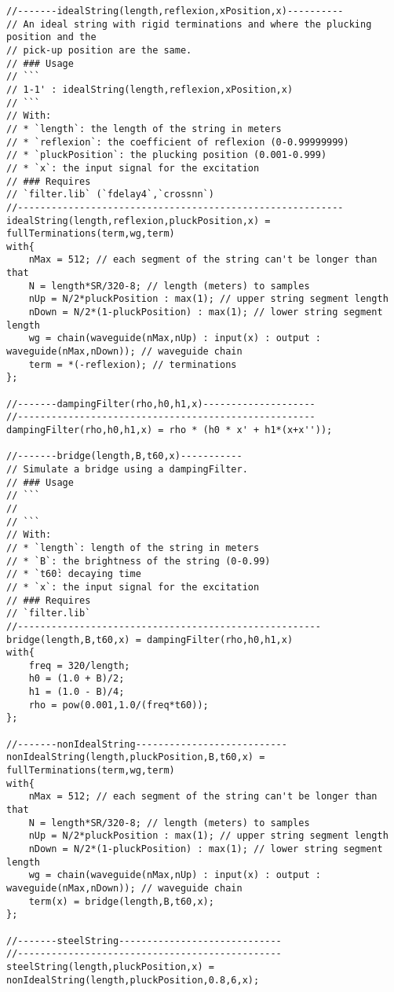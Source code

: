 \begin{lstlisting}
//-------idealString(length,reflexion,xPosition,x)----------
// An ideal string with rigid terminations and where the plucking position and the 
// pick-up position are the same. 
// ### Usage
// ```
// 1-1' : idealString(length,reflexion,xPosition,x)
// ```
// With:
// * `length`: the length of the string in meters
// * `reflexion`: the coefficient of reflexion (0-0.99999999)
// * `pluckPosition`: the plucking position (0.001-0.999)
// * `x`: the input signal for the excitation
// ### Requires
// `filter.lib` (`fdelay4`,`crossnn`)
//----------------------------------------------------------
idealString(length,reflexion,pluckPosition,x) = fullTerminations(term,wg,term)
with{
	nMax = 512; // each segment of the string can't be longer than that
	N = length*SR/320-8; // length (meters) to samples
	nUp = N/2*pluckPosition : max(1); // upper string segment length
	nDown = N/2*(1-pluckPosition) : max(1); // lower string segment length
	wg = chain(waveguide(nMax,nUp) : input(x) : output : waveguide(nMax,nDown)); // waveguide chain
	term = *(-reflexion); // terminations
};

//-------dampingFilter(rho,h0,h1,x)--------------------
//-----------------------------------------------------
dampingFilter(rho,h0,h1,x) = rho * (h0 * x' + h1*(x+x''));

//-------bridge(length,B,t60,x)-----------
// Simulate a bridge using a dampingFilter.
// ### Usage
// ```
//
// ```
// With:
// * `length`: length of the string in meters
// * `B`: the brightness of the string (0-0.99)
// * `t60̀: decaying time
// * `x`: the input signal for the excitation
// ### Requires
// `filter.lib`
//------------------------------------------------------
bridge(length,B,t60,x) = dampingFilter(rho,h0,h1,x)
with{
	freq = 320/length;
	h0 = (1.0 + B)/2;
	h1 = (1.0 - B)/4;
	rho = pow(0.001,1.0/(freq*t60));
};

//-------nonIdealString---------------------------
nonIdealString(length,pluckPosition,B,t60,x) = fullTerminations(term,wg,term)
with{
	nMax = 512; // each segment of the string can't be longer than that
	N = length*SR/320-8; // length (meters) to samples
	nUp = N/2*pluckPosition : max(1); // upper string segment length
	nDown = N/2*(1-pluckPosition) : max(1); // lower string segment length
	wg = chain(waveguide(nMax,nUp) : input(x) : output : waveguide(nMax,nDown)); // waveguide chain
	term(x) = bridge(length,B,t60,x);
};

//-------steelString-----------------------------
//-----------------------------------------------
steelString(length,pluckPosition,x) = nonIdealString(length,pluckPosition,0.8,6,x);


\end{lstlisting}
